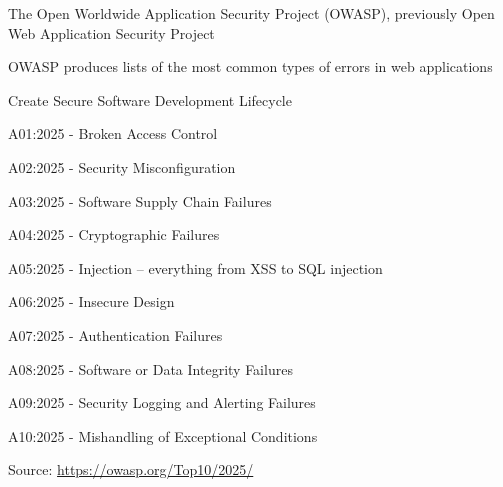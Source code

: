 \documentclass[Screen16to9,17pt]{foils}
\begin{document}
\begin{list1}
\item The Open Worldwide Application Security Project (OWASP), previously Open Web Application Security Project
\item OWASP produces lists of the most common types of errors in web applications
\item {}
\item Create Secure Software Development Lifecycle
\end{list1}



\begin{list2}
\item A01:2025 - Broken Access Control
\item A02:2025 - Security Misconfiguration
\item A03:2025 - Software Supply Chain Failures
\item A04:2025 - Cryptographic Failures
\item A05:2025 - Injection -- everything from XSS to SQL injection
\item A06:2025 - Insecure Design
\item A07:2025 - Authentication Failures
\item A08:2025 - Software or Data Integrity Failures
\item A09:2025 - Security Logging and Alerting Failures
\item A10:2025 - Mishandling of Exceptional Conditions
\end{list2}
Source: \url{https://owasp.org/Top10/2025/}




\end{document}
